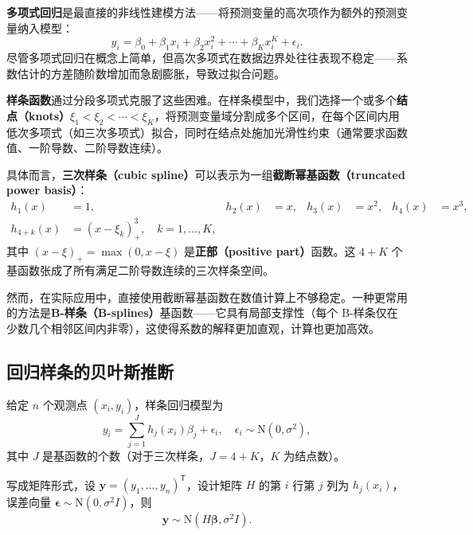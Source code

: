 \textbf{多项式回归}是最直接的非线性建模方法——将预测变量的高次项作为额外的预测变量纳入模型：
\begin{equation}
y_i = \beta_0 + \beta_1 x_i + \beta_2 x_i^2 + \cdots + \beta_K x_i^K + \epsilon_i.
\label{eq:polynomial-regression}
\end{equation}
尽管多项式回归在概念上简单，但高次多项式在数据边界处往往表现不稳定——系数估计的方差随阶数增加而急剧膨胀，导致过拟合问题。

\textbf{样条函数}通过分段多项式克服了这些困难。在样条模型中，我们选择一个或多个\textbf{结点（knots）}$\xi_1 < \xi_2 < \cdots < \xi_K$，将预测变量域分割成多个区间，在每个区间内用低次多项式（如三次多项式）拟合，同时在结点处施加光滑性约束（通常要求函数值、一阶导数、二阶导数连续）。

具体而言，\textbf{三次样条（cubic spline）}可以表示为一组\textbf{截断幂基函数（truncated power basis）}：
\begin{align}
h_1(x) &= 1, & h_2(x) &= x, & h_3(x) &= x^2, & h_4(x) &= x^3, \label{eq:truncated-power-basis} \\
h_{4+k}(x) &= (x - \xi_k)_+^3,\quad k = 1,\ldots, K, \label{eq:knot-basis}
\end{align}
其中 $(x - \xi)_+ = \max(0, x - \xi)$ 是\textbf{正部（positive part）}函数。这 $4+K$ 个基函数张成了所有满足二阶导数连续的三次样条空间。

然而，在实际应用中，直接使用截断幂基函数在数值计算上不够稳定。一种更常用的方法是\textbf{B-样条（B-splines）}基函数——它具有局部支撑性（每个 B-样条仅在少数几个相邻区间内非零），这使得系数的解释更加直观，计算也更加高效。

\subsection{回归样条的贝叶斯推断}\label{sec:bayesian-spline-inference}

给定 $n$ 个观测点 $(x_i, y_i)$，样条回归模型为
\begin{equation}
y_i = \sum_{j=1}^{J} h_j(x_i) \beta_j + \epsilon_i,\quad \epsilon_i \sim \mathrm{N}(0, \sigma^2),
\label{eq:spline-model}
\end{equation}
其中 $J$ 是基函数的个数（对于三次样条，$J = 4 + K$，$K$ 为结点数）。

写成矩阵形式，设 $\mathbf{y} = (y_1, \ldots, y_n)^{\mathsf{T}}$，设计矩阵 $H$ 的第 $i$ 行第 $j$ 列为 $h_j(x_i)$，误差向量 $\boldsymbol{\epsilon} \sim \mathrm{N}(0, \sigma^2 I)$，则
\begin{equation}
\mathbf{y} \sim \mathrm{N}(H\boldsymbol{\beta}, \sigma^2 I).
\label{eq:spline-linear-model}
\end{equation}

